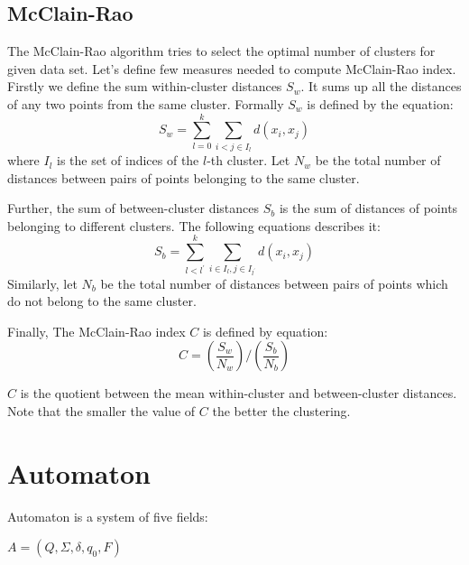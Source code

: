 \documentclass{mini}
\begin{document}
\subsection{McClain-Rao}
The McClain-Rao algorithm tries to select the optimal number of clusters for given data set. Let's define few measures needed to compute McClain-Rao index. Firstly we define the sum within-cluster distances $S_w$. It sums up all the distances of any two points from the same cluster. Formally $S_w$ is defined by the equation: 
\begin{equation}
    S_w = \sum_{l=0}^{k} \sum_{i < j \in I_l} d(x_i, x_j)
\end{equation}
where $I_l$ is the set of indices of the $l$-th cluster. Let $N_w$ be the total number of distances between pairs of points belonging to the same cluster.

Further, the sum of between-cluster distances $S_b$ is the sum of distances of points belonging to different clusters. The following equations describes it:
\begin{equation}
    S_b = \sum_{l < l^{'}}^{k} \sum_{i \in I_{l}, j \in I_{l^{'}}}  d(x_i, x_j)
\end{equation}
Similarly, let $N_b$ be the total number of distances between pairs of points which do not belong to the same cluster.

Finally, The McClain-Rao index $C$ is defined by equation: 
\begin{equation}
    C =  (\frac{S_w}{N_w}) / (\frac{S_b}{N_b})
\end{equation}

$C$ is the quotient between the mean within-cluster and between-cluster distances.
Note that the smaller the value of $C$ the better the clustering.

\section{Automaton} \label{sec:autom}
Automaton is a system of five fields:
\begin{center}
    $A = (Q, \Sigma, \delta, q_0, F)$
\end{center}
\end{document}
